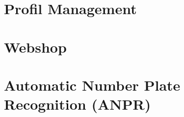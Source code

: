 \section{Profil Management}
\lipsum[5-12]

\section{Webshop}
\lipsum[5-12]


\section{Automatic Number Plate Recognition (ANPR)}
\lipsum[5-12]



